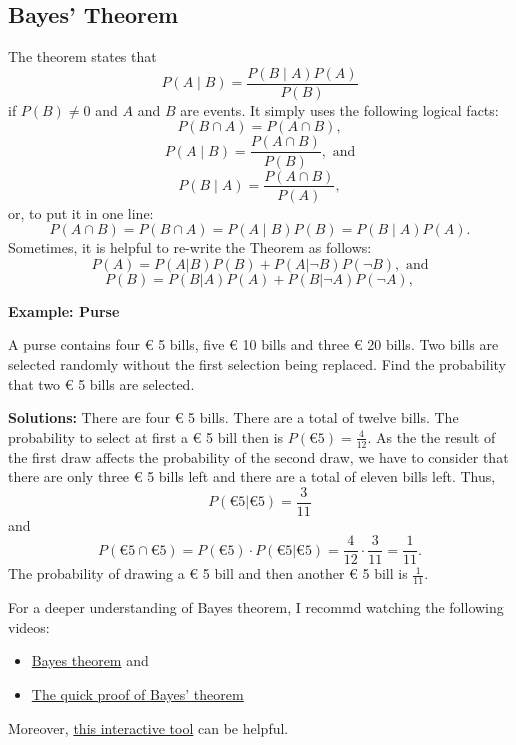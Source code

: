 \documentclass[
  12pt,
  oneside]{book}
\providecommand{\tightlist}{%
  \setlength{\itemsep}{0pt}\setlength{\parskip}{0pt}}
\theoremstyle{definition}
\theoremstyle{definition}
\theoremstyle{definition}
\theoremstyle{definition}
\theoremstyle{remark}
\begin{document}
\hypertarget{bayes-theorem}{%
\subsection{Bayes' Theorem}\label{bayes-theorem}}

The theorem states that
\[P(A\mid B)={\frac {P(B\mid A)P(A)}{P(B)}} \]
if \(P(B)\neq 0\) and \(A\) and \(B\) are events. It simply uses the following logical facts:
\[P(B\cap A)=P(A\cap B),\]
\[P(A\mid B)=\frac {P(A\cap B)}{P(B)},  \text{ and}\]
\[P(B\mid A)=\frac {P(A\cap B)}{P(A)},\]
or, to put it in one line:
\[  P(A\cap B)= P(B\cap A)=P(A\mid B)P(B)=P(B\mid A)P(A).   \]
Sometimes, it is helpful to re-write the Theorem as follows:
\[P(A)=P(A|B)P(B)+P(A|\neg B)P(\neg B),  \text{ and}\]
\[P(B)=P(B|A)P(A)+P(B|\neg A)P(\neg A),\]

\textbf{Example: Purse}

A purse contains four € 5 bills, five € 10 bills and three € 20 bills. Two bills are selected randomly without the first selection being replaced. Find the probability that two € 5 bills are selected.

\textbf{Solutions:} There are four € 5 bills. There are a total of twelve bills.
The probability to select at first a € 5 bill then is \(P(\text{€} 5) = \frac{4}{12}\).
As the the result of the first draw affects the probability of the second draw, we have to consider that there are only three € 5 bills left and there are a total of eleven bills left. Thus,
\[
P(\text{€} 5 | \text{€} 5)=\frac{3}{11}
\]
and
\[
P(\text{€} 5 \cap \text{€} 5) = P(\text{€} 5) \cdot P(\text{€} 5 | \text{€} 5) = \frac{4}{12} \cdot \frac{3}{11}=\frac{1}{11}.
\]
The probability of drawing a € 5 bill and then another € 5 bill is \(\frac{1}{11}\).

For a deeper understanding of Bayes theorem, I recommd watching the following videos:

\begin{itemize}
\tightlist
\item
  \href{https://youtu.be/HZGCoVF3YvM}{Bayes theorem} and
\item
  \href{https://youtu.be/U_85TaXbeIo}{The quick proof of Bayes' theorem}
\end{itemize}

Moreover, \href{https://www.skobelevs.ie/BayesTheorem/}{this interactive tool} can be helpful.
\end{document}
